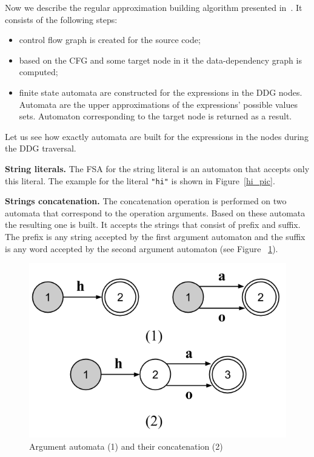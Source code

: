 Now we describe the regular approximation building algorithm presented in~\cite{Upper_Approximation:ref}. It consists of the following steps:
\begin{itemize}
\item control flow graph is created for the source code;
\item based on the CFG and some target node in it the data-dependency graph is computed;
\item finite state automata are constructed for the expressions in the DDG nodes. Automata are the upper approximations of the expressions' possible values sets. Automaton corresponding to the target node is returned as a result.
\end{itemize}

Let us see how exactly automata are built for the expressions in the nodes during the DDG traversal.

{\bf String literals.} The FSA for the string literal is an automaton that accepts only this literal. The example for the literal \verb|"hi"| is shown in Figure~\ref{hi_pic}.

\textbf{Strings concatenation.} The concatenation operation is performed on two automata that correspond to the operation arguments. Based on these automata the resulting one is built. It accepts the strings that consist of prefix and suffix. The prefix is any string accepted by the first argument automaton and the suffix is any word accepted by the second argument automaton (see Figure ~\ref{concat_pic}).

\begin{figure}[h!]
    \begin{center}
        \includegraphics[scale=0.3]{Figures/automata_concat.png}
    \end{center}
    \caption{Argument automata (1) and their concatenation (2)}
    \label{concat_pic}
\end{figure} 

